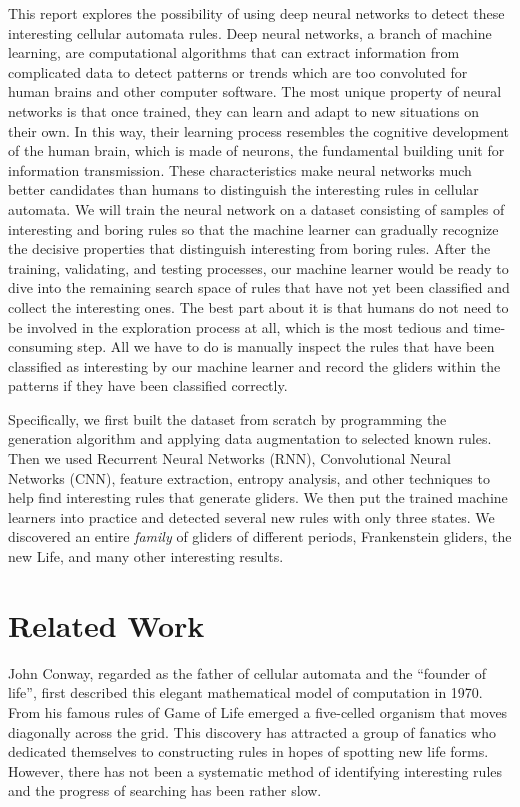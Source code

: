 \documentclass[12pt]{article}
\numberwithin{figure}{section} %
\begin{document}
This report explores the possibility of using deep neural networks to detect these interesting cellular automata rules. Deep neural networks, a branch of machine learning, are computational algorithms that can extract information from complicated data to detect patterns or trends which are too convoluted for human brains and other computer software. The most unique property of neural networks is that once trained, they can learn and adapt to new situations on their own. In this way, their learning process resembles the cognitive development of the human brain, which is made of neurons, the fundamental building unit for information transmission. These characteristics make neural networks much better candidates than humans to distinguish the interesting rules in cellular automata. We will train the neural network on a dataset consisting of samples of interesting and boring rules so that the machine learner can gradually recognize the decisive properties that distinguish interesting from boring rules. After the training, validating, and testing processes, our machine learner would be ready to dive into the remaining search space of rules that have not yet been classified and collect the interesting ones. The best part about it is that humans do not need to be involved in the exploration process at all, which is the most tedious and time-consuming step. All we have to do is manually inspect the rules that have been classified as interesting by our machine learner and record the gliders within the patterns if they have been classified correctly. 

Specifically, we first built the dataset from scratch by programming the generation algorithm and applying data augmentation to selected known rules. Then we used Recurrent Neural Networks (RNN), Convolutional Neural Networks (CNN), feature extraction, entropy analysis, and other techniques to help find interesting rules that generate gliders. We then put the trained machine learners into practice and detected several new rules with only three states. We discovered an entire \textit{family} of gliders of different periods, Frankenstein gliders, the new Life, and many other interesting results.

\newpage
\section{Related Work}
\label{Related Work}
John Conway, regarded as the father of cellular automata and the “founder of life”, first described this elegant mathematical model of computation in 1970. From his famous rules of Game of Life emerged a five-celled organism that moves diagonally across the grid. This discovery has attracted a group of fanatics who dedicated themselves to constructing rules in hopes of spotting new life forms. However, there has not been a systematic method of identifying interesting rules and the progress of searching has been rather slow. 
\end{document}
